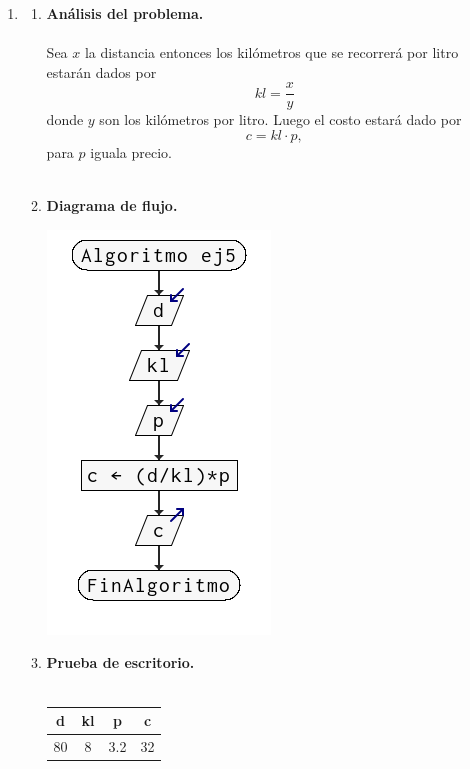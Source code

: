 \begin{enumerate}
\begin{enumerate}[\bfseries a)]
\end{enumerate}

\newpage


\item 
\begin{enumerate}[\bfseries a)]
    
    \item \textbf{Análisis del problema.}\\\\
	Sea $x$ la distancia entonces los kilómetros que se recorrerá por litro estarán dados por $$kl = \dfrac{x}{y}$$
	donde $y$ son los kilómetros por litro. Luego el costo estará dado por $$c = kl\cdot p,$$ para $p$ iguala precio.\\\\


    \item \textbf{Diagrama de flujo.}\\
	\begin{center}
	    \includegraphics[scale=.9]{imagenes/tarea2/ej5df.png}
	\end{center}
	\vspace{.5cm}

    \item \textbf{Prueba de escritorio.}\\\\
	\begin{center}
	    \begin{tabular}{c|c|c|c}
		d&kl&p&c\\
		\hline
		80&8&3.2&32\\
	    \end{tabular}
	\end{center}
	\vspace{1cm}
    

\end{enumerate}
\end{enumerate}
